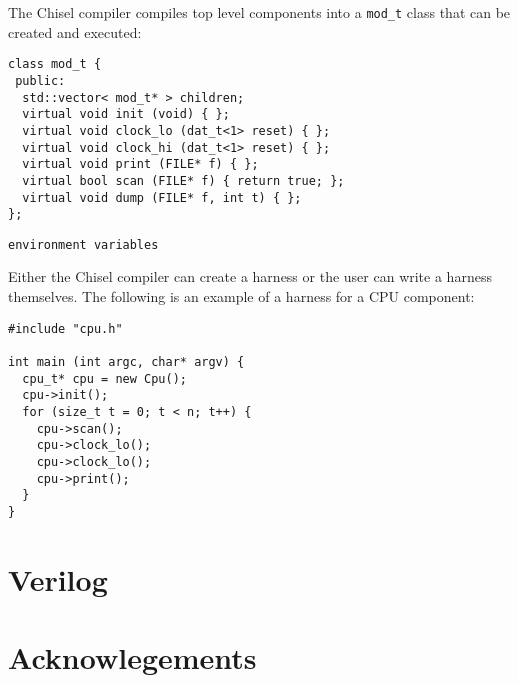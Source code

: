 \documentclass[10pt,twocolumn]{article}
\begin{document}
The Chisel compiler compiles top level components into a \verb+mod_t+
class that can be created and executed:

\begin{verbatim}
class mod_t {
 public:
  std::vector< mod_t* > children;
  virtual void init (void) { };
  virtual void clock_lo (dat_t<1> reset) { };
  virtual void clock_hi (dat_t<1> reset) { };
  virtual void print (FILE* f) { };
  virtual bool scan (FILE* f) { return true; };
  virtual void dump (FILE* f, int t) { };
};
\end{verbatim}

\begin{verbatim}
environment variables
\end{verbatim}

Either the Chisel compiler can create a harness or the user can write
a harness themselves.  The following is an example of a harness for a
CPU component:

\begin{verbatim}
#include "cpu.h"

int main (int argc, char* argv) {
  cpu_t* cpu = new Cpu();  
  cpu->init();
  for (size_t t = 0; t < n; t++) {
    cpu->scan();
    cpu->clock_lo();
    cpu->clock_lo();
    cpu->print();
  }
}
\end{verbatim}

\section{Verilog}

\section{Acknowlegements}
\end{document}
